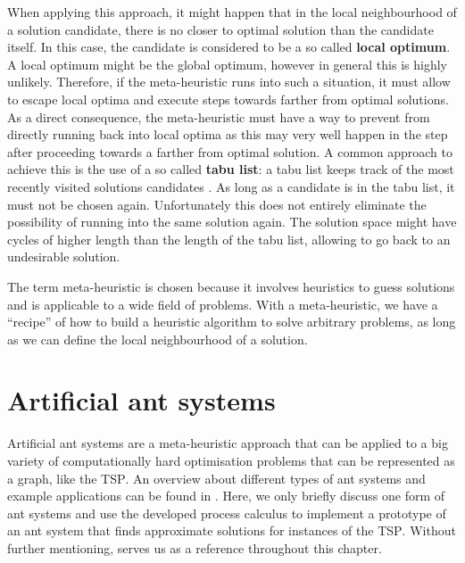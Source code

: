 When applying this approach, it might happen that in the local neighbourhood of a solution candidate, there is no closer to optimal solution than the candidate itself. In this case, the candidate is considered to be a so called \textbf{local optimum}. A local optimum might be the global optimum, however in general this is highly unlikely. Therefore, if the meta-heuristic runs into such a situation, it must allow to escape local optima and execute steps towards farther from optimal solutions. As a direct consequence, the meta-heuristic must have a way to prevent from directly running back into local optima as this may very well happen in the step after proceeding towards a farther from optimal solution. A common approach to achieve this is the use of a so called \textbf{tabu list}: a tabu list keeps track of the most recently visited solutions candidates \cite{Dorigo:2004:ACO:975277}. As long as a candidate is in the tabu list, it must not be chosen again. Unfortunately this does not entirely eliminate the possibility of running into the same solution again. The solution space might have cycles of higher length than the length of the tabu list, allowing to go back to an undesirable solution.

The term meta-heuristic is chosen because it involves heuristics to guess solutions and is applicable to a wide field of problems. With a meta-heuristic, we have a \enquote{recipe} of how to build a heuristic algorithm to solve arbitrary problems, as long as we can define the local neighbourhood of a solution.

\section{Artificial ant systems}
\label{chp:ant_system}
Artificial ant systems are a meta-heuristic approach that can be applied to a big variety of computationally hard optimisation problems that can be represented as a graph, like the \textsc{TSP}. An overview about different types of ant systems and example applications can be found in \cite{Dorigo:2004:ACO:975277}. Here, we only briefly discuss one form of ant systems and use the developed process calculus to implement a prototype of an ant system that finds approximate solutions for instances of the \textsc{TSP}. Without further mentioning, \cite{Dorigo:2004:ACO:975277} serves us as a reference throughout this chapter.

